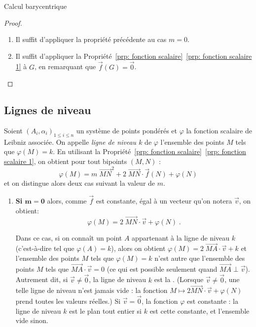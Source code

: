 \begin{chapter}{Calcul barycentrique}
\begin{prp}
\begin{proof}
\begin{enumerate}
\begin{align*}
                 & = \sum_{i = 1}^n \alpha_i \; {\overrightarrow{MN}}^2
                   + \sum_{i = 1}^n \alpha_i \; 2 \; \overrightarrow{MN} \cdot \overrightarrow{NA_i}
                   + \sum_{i = 1}^n \alpha_i \; {\overrightarrow{N A_i}}^2 \\
                 & = m \; {\overrightarrow{MN}}^2 + 2 \; \overrightarrow{MN} \cdot \vec{f}(N) + \varphi(N) \;.
      \end{align*}
\item Il suffit d'appliquer la propri\'et\'e pr\'ec\'edente au cas $m = 0$.      
\item Il suffit d'appliquer la Propri\'et\'e~\ref{prp: fonction scalaire}~\ref{prp: fonction scalaire 1} \`a $G$, en remarquant que $\vec{f}(G) = \vec{0}$.
\end{enumerate}
\end{proof}
\end{prp}
%
\subsection{Lignes de niveau}
%
Soient $(A_i , \alpha_i)_{1\leq i\leq n}$ un syst\`eme de points pond\'er\'es et $\varphi$ la fonction scalaire de Leibniz associ\'ee.
On appelle \emph{ligne de niveau $k$} de $\varphi$ l'ensemble des points $M$ tels que $\varphi(M) = k$.
En utilisant la Propri\'et\'e~\ref{prp: fonction scalaire}~\ref{prp: fonction scalaire 1}, on obtient pour tout bipoints $(M,N)$ :
\begin{displaymath}
\varphi(M) = m \; {\overrightarrow{MN}}^2 + 2 \; \overrightarrow{MN} \cdot \vec{f}(N) + \varphi(N)
\end{displaymath}
et on distingue alors deux cas suivant la valeur de $m$.
\begin{enumerate}
\item \textbf{Si $\mathbf{m = 0}$ }
      alors, comme $\vec{f}$ est constante, \'egal \`a un vecteur qu'on notera $\vec{v}$, on obtient: 
      $$
      \varphi (M) = 2 \; {\overrightarrow{MN}} \cdot \vec{v} + \varphi (N)
      \; .
      $$
      
      Dans ce cas, si on conna\^it un point $A$ appartenant \`a la ligne de niveau $k$ (c'est-\`a-dire tel que $\varphi (A) = k$),
      alors on obtient 
      $
      \varphi (M) = 2 \; \overrightarrow{MA} \cdot \vec{v} + k
      $
      et l'ensemble des points $M$ tels que $\varphi (M) = k$ n'est autre que l'ensemble des points $M$ tels que 
      $\overrightarrow{MA} \cdot \vec{v} = 0$ (ce qui est possible seulement quand $\overrightarrow{MA} \perp \vec{v}$). 
      Autrement dit, si $\vec{v} \neq \vec{0}$, la ligne de niveau $k$ est la 
      .
      (Lorsque $\vec{v} \neq \vec{0}$, une telle ligne de niveau n'est jamais vide : la fonction $M \mapsto 2 \overrightarrow{MN} \cdot \vec{v} + \varphi(N)$ prend toutes les valeurs r\'eelles.)
      Si $\vec{v} = \vec{0}$, la fonction $\varphi$ est constante : la ligne de niveau $k$ est le plan tout entier si $k$ est cette constante, et l'ensemble vide sinon.
      

\end{enumerate}
\end{chapter}

